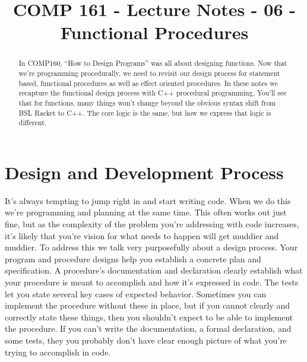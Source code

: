\documentclass[]{tufte-handout}
\title{COMP 161 - Lecture Notes - 06 - Functional Procedures}
\begin{document}
 
\maketitle

\begin{abstract}
In COMP160, ``How to Design Programs'' was all about designing functions.  Now that we're programming procedurally, we need to revisit our design process for statement based, functional procedures as well as effect oriented procedures.  In these notes we recapture the functional design process with C++ procedural programming. You'll see that for functions, many things won't change beyond the obvious syntax shift from BSL Racket to C++.  The core logic is the same, but how we express that logic is different. 
\end{abstract}

\section{Design and Development Process}

It's always tempting to jump right in and start writing code. When we do this we're programming and planning at the same time. This often works out just fine, but as the complexity of the problem you're addressing with code increases, it's likely that you're vision for what needs to happen will get muddier and muddier. To address this we talk very purposefully about a design process. Your program and procedure designs help you establish a concrete plan and specification. A procedure's documentation and declaration clearly establish what your procedure is meant to accomplish and how it's expressed in code. The tests let you state several key cases of expected behavior. Sometimes you can implement the procedure without these in place, but if you cannot clearly and correctly state these things, then you shouldn't expect to be able to implement the procedure. If you can't write the documentation, a formal declaration, and some tests, they you probably don't have clear enough picture of what you're trying to accomplish in code. 
\end{document}
